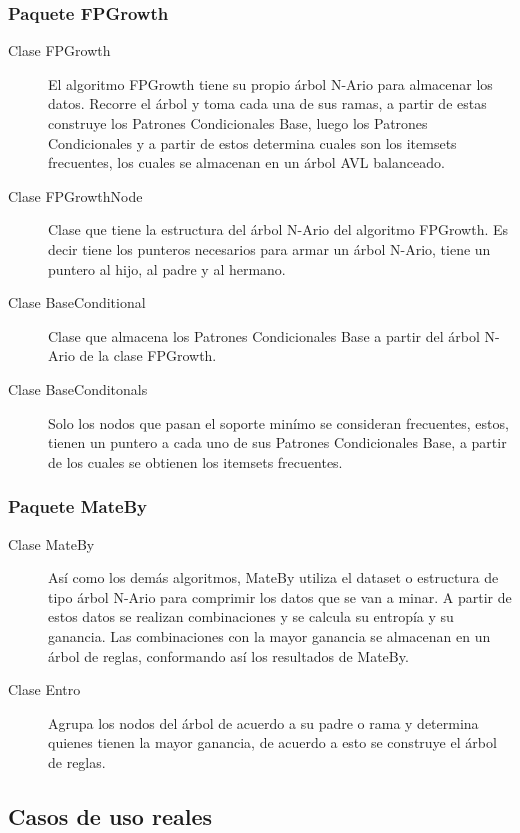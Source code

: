 \subsubsection{Paquete FPGrowth}
\begin{description}
\item [Clase FPGrowth] El algoritmo FPGrowth tiene su propio \'arbol N-Ario para almacenar los datos. Recorre el
\'arbol y toma cada una de sus ramas, a partir de estas construye los Patrones Condicionales Base, luego los
Patrones Condicionales y a partir de estos determina cuales son los itemsets frecuentes, los cuales se almacenan en
un \'arbol AVL balanceado.
\item [Clase FPGrowthNode] Clase que tiene la estructura del \'arbol N-Ario del algoritmo FPGrowth. Es decir tiene
los punteros necesarios para armar un \'arbol N-Ario, tiene un puntero al hijo, al padre y al hermano.
\item [Clase BaseConditional] Clase que almacena los Patrones Condicionales Base a partir del \'arbol N-Ario de la 
clase FPGrowth.
\item [Clase BaseConditonals] Solo los nodos que pasan el soporte min\'imo se consideran frecuentes, estos, tienen
un puntero a cada uno de sus Patrones Condicionales Base, a partir de los cuales se obtienen los itemsets
frecuentes.
\end{description}

\subsubsection{Paquete MateBy}
\begin{description}
\item [Clase MateBy] As\'i como los dem\'as algoritmos, MateBy utiliza el dataset o estructura de tipo
\'arbol N-Ario para comprimir los datos que se van a minar. A partir de estos datos se realizan
combinaciones y se calcula su entrop\'ia y su ganancia. Las combinaciones con la mayor ganancia se
almacenan en un \'arbol de reglas, conformando as\'i los resultados de MateBy.
\item [Clase Entro] Agrupa los nodos del \'arbol de acuerdo a su padre o rama y determina quienes tienen
la mayor ganancia, de acuerdo a esto se construye el \'arbol de reglas.
\end{description}

\newpage
\subsection{Casos de uso reales}
